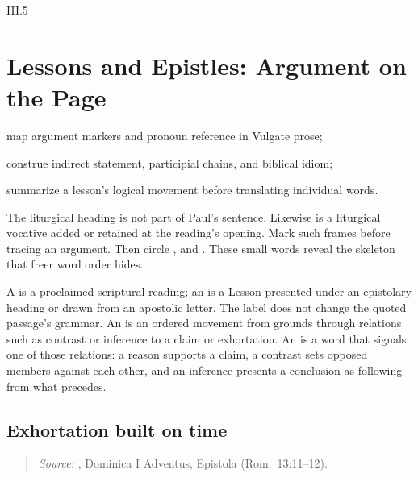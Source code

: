 \begin{courseunit}{III.5}
\chapter{Lessons and Epistles: Argument on the Page}

\begin{learningobjectives}
  \item map argument markers and pronoun reference in Vulgate prose;
  \item construe indirect statement, participial chains, and biblical idiom;
  \item summarize a lesson's logical movement before translating individual words.
\end{learningobjectives}

The liturgical heading  is not part
of Paul's sentence. Likewise  is a liturgical vocative added or
retained at the reading's opening. Mark such frames before tracing an argument.
Then circle , and
. These small words reveal the skeleton that freer word order hides.

A  is a proclaimed scriptural reading; an  is a
Lesson presented under an epistolary heading or drawn from an apostolic
letter. The label does not change the quoted passage's grammar. An
 is an ordered movement from grounds through relations such as
contrast or inference to a claim or exhortation. An 
is a word that signals one of those relations: a reason supports a claim, a
contrast sets opposed members against each other, and an inference presents a
conclusion as following from what precedes.

\section{Exhortation built on time}

\begin{quote}

\emph{Source:} \Missal, Dominica I Adventus, Epistola (Rom.~13:11--12).
\end{quote}


\end{courseunit}
